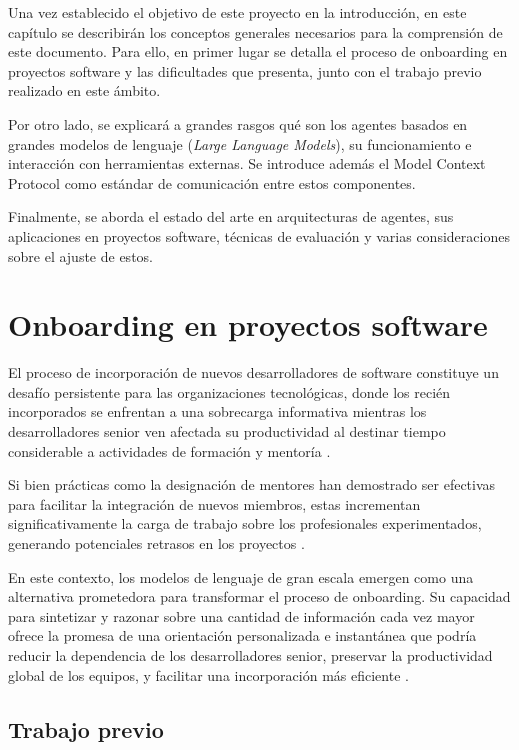 Una vez establecido el objetivo de este proyecto en la introducción, en este capítulo se describirán los conceptos generales necesarios para la comprensión de este documento. Para ello, en primer lugar se detalla el proceso de onboarding en proyectos software y las dificultades que presenta, junto con el trabajo previo realizado en este ámbito.

Por otro lado, se explicará a grandes rasgos qué son los agentes basados en grandes modelos de lenguaje (\textit{Large Language Models}), su funcionamiento e interacción con herramientas externas. Se introduce además el Model Context Protocol como estándar de comunicación entre estos componentes.


Finalmente, se aborda el estado del arte en arquitecturas de agentes, sus aplicaciones en proyectos software, técnicas de evaluación y varias consideraciones sobre el ajuste de estos.

\section{Onboarding en proyectos software}
El proceso de incorporación de nuevos desarrolladores de software constituye un desafío persistente para las organizaciones tecnológicas, donde los recién incorporados se enfrentan a una sobrecarga informativa mientras los desarrolladores senior ven afectada su productividad al destinar tiempo considerable a actividades de formación y mentoría \cite{sim_ramp-up_1998}. 

Si bien prácticas como la designación de mentores han demostrado ser efectivas para facilitar la integración de nuevos miembros, estas incrementan significativamente la carga de trabajo sobre los profesionales experimentados, generando potenciales retrasos en los proyectos \cite{steinmacher_systematic_2015}.

En este contexto, los modelos de lenguaje de gran escala emergen como una alternativa prometedora para transformar el proceso de onboarding. Su capacidad para sintetizar y razonar sobre una cantidad de información cada vez mayor ofrece la promesa de una orientación personalizada e instantánea que podría reducir la dependencia de los desarrolladores senior, preservar la productividad global de los equipos, y facilitar una incorporación más eficiente \cite{ritz_artificial_2023}.

\subsection{Trabajo previo}
\label{sec:trabajo_previo}

